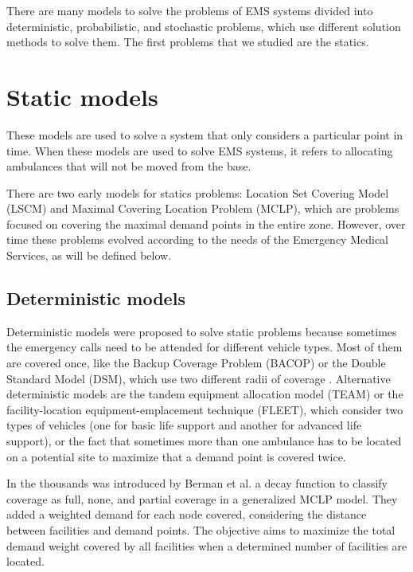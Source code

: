 There are many models to solve the problems of EMS systems divided into deterministic, probabilistic, and stochastic problems, which use different solution methods to solve them. The first problems that we studied are the statics. 

\section{Static models}

These models are used to solve a system that only considers a particular point in time. When these models are used to solve EMS systems, it refers to allocating ambulances that will not be moved from the base. 

There are two early models for statics problems: Location Set Covering Model (LSCM) and Maximal Covering Location Problem (MCLP), which are problems focused on covering the maximal demand points in the entire zone. However, over time these problems evolved according to the needs of the Emergency Medical Services, as will be defined below.


\subsection{Deterministic models}

Deterministic models were proposed to solve static problems because sometimes the emergency calls need to be attended for different vehicle types. Most of them are covered once, like the Backup Coverage Problem (BACOP) or the Double Standard Model (DSM), which use two different radii of coverage \cite{li2011covering}. Alternative deterministic models are the tandem equipment allocation model (TEAM) or the facility-location equipment-emplacement technique (FLEET), which consider two types of vehicles (one for basic life support and another for advanced life support), or the fact that sometimes more than one ambulance has to be located on a potential site to maximize that a demand point is covered twice. 

In the thousands was introduced by Berman et al. \cite{berman2003gradual} a decay function to classify coverage as full, none, and partial coverage in a generalized MCLP model. They added a weighted demand for each node covered, considering the distance between facilities and demand points. The objective aims to maximize the total demand weight covered by all facilities when a determined number of facilities are located.

